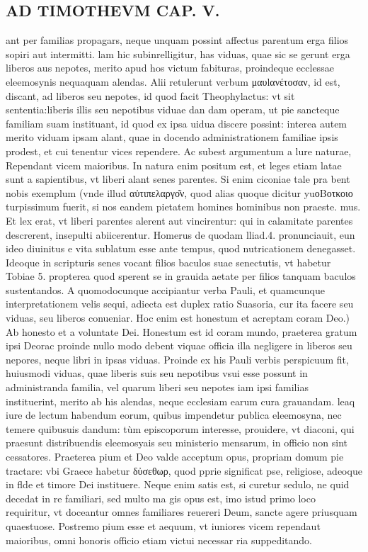 \documentclass{article}
\begin{document}
\begin{pages}
\section*{AD TIMOTHEVM CAP. V. }
\marginpar{[ p.105 ]}\pstart ant per familias propagars, neque unquam possint affectus parentum erga filios sopiri aut intermitti. lam hic subinrelligitur, has viduas, quae sic se gerunt erga liberos aus nepotes, merito apud hos victum fabituras, proindeque ecclessae eleemosynis nequaquam alendas. Alii retulerunt verbum μαυlανέτοσαν, id est, discant, ad liberos seu nepotes, id quod facit Theophylactus: vt sit sententia:liberis illis seu nepotibus viduae dan dam operam, ut pie sancteque familiam suam instituant, id quod ex ipsa uidua discere possint: interea autem merito viduam ipsam alant, quae in docendo administrationem familiae ipsis prodest, et cui tenentur vices rependere. Ac subest argumentum a lure naturae, Rependant vicem maioribus. In natura enim positum est, et leges etiam latae sunt a sapientibus, vt liberi alant senes parentes. Si enim ciconiae tale pra bent nobis exemplum (vnde illud αὐτιπελαργο͂ν, quod alias quoque dicitur yuοΒοτκοιο turpissimum fuerit, si nos eandem pietatem homines hominibus non praeste. mus. Et lex erat, vt liberi parentes alerent aut vincirentur: qui in calamitate parentes descrerent, insepulti abiicerentur. Homerus de quodam lliad.4. pronunciauit, eun ideo diuinitus e vita sublatum esse ante tempus, quod nutricationem denegasset. Ideoque in scripturis senes vocant filios baculos suae senectutis, vt habetur Tobiae 5. propterea quod sperent se in grauida aetate per filios tanquam baculos sustentandos. A quomodocunque accipiantur verba Pauli, et quamcunque interpretationem velis sequi, adiecta est duplex ratio Suasoria, cur ita facere seu viduas, seu liberos conueniar.  \pend\pstart Hoc enim est honestum et acreptam coram Deo.) Ab honesto et a voluntate Dei. Honestum est id coram mundo, praeterea gratum ipsi Deorac proinde nullo modo debent viquae officia illa negligere in liberos seu nepores, neque libri in ipsas viduas. Proinde ex his Pauli verbis perspicuum fit, huiusmodi viduas, quae liberis suis seu nepotibus vsui esse possunt in administranda familia, vel quarum liberi seu nepotes iam ipsi familias instituerint, merito ab his alendas, neque ecclesiam earum cura grauandam. leaq iure de lectum habendum eorum, quibus impendetur publica eleemosyna, nec temere quibusuis dandum: tùm episcoporum interesse, prouidere, vt diaconi, qui praesunt distribuendis eleemosyais seu ministerio mensarum, in officio non sint cessatores. Praeterea pium et Deo valde acceptum opus, propriam domum pie tractare: vbi Graece habetur δὐσεθωρ, quod pprie significat pse, religiose, adeoque in flde et timore Dei instituere. Neque enim satis est, si curetur sedulo, ne quid decedat in re familiari, sed multo ma gis opus est, imo istud primo loco requiritur, vt doceantur omnes familiares reuereri Deum, sancte agere priusquam quaestuose. Postremo pium esse et aequum, vt iuniores vicem rependaut maioribus, omni honoris officio etiam victui necessar ria suppeditando.  \pend

\end{pages}
\end{document}
